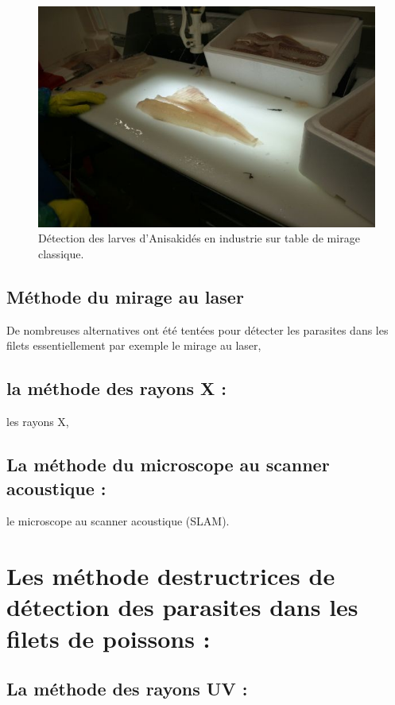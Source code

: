\documentclass[12pt,a4paper]{article}
\begin{document}
\begin{figure}[!h]
   \center
   \includegraphics[scale=0.5]{Table_mirage.png}
   \caption {Détection des larves d'Anisakidés en industrie sur table de mirage classique.}
\end{figure}

\subsection{Méthode du mirage au laser}

De nombreuses alternatives ont été tentées pour détecter les parasites dans les filets  essentiellement  par exemple le mirage au laser,
\subsection{ la méthode des rayons X :}
 les rayons X,


\subsection{La méthode du  microscope au scanner acoustique :}
le microscope au scanner acoustique (SLAM).



\section {Les  méthode destructrices de détection des parasites dans les filets de poissons :}
\subsection{La méthode des rayons UV :}
\end{document}
